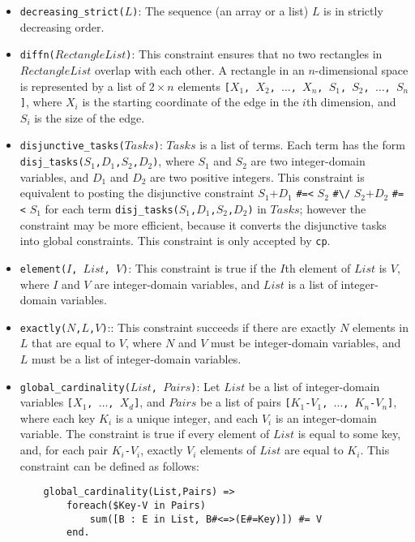 \begin{itemize}
\item \texttt{decreasing\_strict($L$)}: The sequence (an array or a list) $L$ is in strictly decreasing order.

\item \texttt{diffn($RectangleList$)}: This constraint ensures that no two rectangles in $RectangleList$ overlap with each other. A rectangle in an $n$-dimensional space is represented by a list of $2\times n$ elements \texttt{[$X_1$, $X_2$, $\ldots$, $X_n$, $S_1$, $S_2$, $\ldots$, $S_n$]}, where \texttt{$X_i$} is the starting coordinate of the edge in the $i$th dimension, and \texttt{$S_i$} is the size of the edge.

\item \texttt{disjunctive\_tasks($Tasks$)}: $Tasks$ is a list of terms.  Each term has the form \\ \texttt{disj\_tasks($S_1$,$D_1$,$S_2$,$D_2$)}, where \texttt{$S_1$} and \texttt{$S_2$} are two integer-domain variables, and \texttt{$D_1$} and \texttt{$D_2$} are two positive integers. This constraint is equivalent to posting the disjunctive constraint $S_1$+$D_1$ \verb+#=<+ $S_2$ \verb+#\/+ $S_2$+$D_2$ \verb+#=<+ $S_1$ for each term \texttt{disj\_tasks($S_1$,$D_1$,$S_2$,$D_2$)} in $Tasks$; however the constraint may be more efficient, because it converts the disjunctive tasks into global constraints. This constraint is only accepted by \texttt{cp}.
\item \texttt{element($I$, $List$, $V$)}: This constraint is true if the $I$th element of $List$ is $V$, where $I$ and $V$ are integer-domain variables, and $List$ is a list of integer-domain variables.

\item \texttt{exactly($N$,$L$,$V$)}:: This constraint succeeds if there are exactly $N$ elements in $L$ that are equal to $V$, where $N$ and $V$ must be integer-domain variables, and $L$ must be a list of integer-domain variables.

\item \texttt{global\_cardinality($List$, $Pairs$)}: Let $List$ be a list of integer-domain variables \texttt{[$X_1$, $\ldots$, $X_d$]}, and $Pairs$ be a list of pairs \texttt{[$K_1$-$V_1$, $\ldots$, $K_n$-$V_n$]}, where each key \texttt{$K_i$} is a unique integer, and each \texttt{$V_i$} is an integer-domain variable. The constraint is true if every element of $List$ is equal to some key, and, for each pair \texttt{$K_i$-$V_i$}, exactly \texttt{$V_i$} elements of $List$ are equal to \texttt{$K_i$}. This constraint can be defined as follows:
\begin{verbatim}
    global_cardinality(List,Pairs) =>
        foreach($Key-V in Pairs) 
            sum([B : E in List, B#<=>(E#=Key)]) #= V
        end.
\end{verbatim}


\end{itemize}
